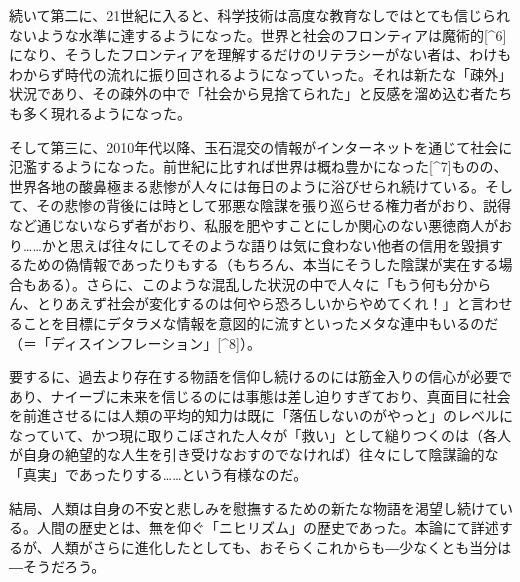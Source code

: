 続いて第二に、21世紀に入ると、科学技術は高度な教育なしではとても信じられないような水準に達するようになった。世界と社会のフロンティアは魔術的{[}\^{}6{]}になり、そうしたフロンティアを理解するだけのリテラシーがない者は、わけもわからず時代の流れに振り回されるようになっていった。それは新たな「疎外」状況であり、その疎外の中で「社会から見捨てられた」と反感を溜め込む者たちも多く現れるようになった。

そして第三に、2010年代以降、玉石混交の情報がインターネットを通じて社会に氾濫するようになった。前世紀に比すれば世界は概ね豊かになった{[}\^{}7{]}ものの、世界各地の酸鼻極まる悲惨が人々には毎日のように浴びせられ続けている。そして、その悲惨の背後には時として邪悪な陰謀を張り巡らせる権力者がおり、説得など通じないならず者がおり、私服を肥やすことにしか関心のない悪徳商人がおり\ldots\ldots かと思えば往々にしてそのような語りは気に食わない他者の信用を毀損するための偽情報であったりもする（もちろん、本当にそうした陰謀が実在する場合もある）。さらに、このような混乱した状況の中で人々に「もう何も分からん、とりあえず社会が変化するのは何やら恐ろしいからやめてくれ！」と言わせることを目標にデタラメな情報を意図的に流すといったメタな連中もいるのだ（＝「ディスインフレーション」{[}\^{}8{]}）。

要するに、過去より存在する物語を信仰し続けるのには筋金入りの信心が必要であり、ナイーブに未来を信じるのには事態は差し迫りすぎており、真面目に社会を前進させるには人類の平均的知力は既に「落伍しないのがやっと」のレベルになっていて、かつ現に取りこぼされた人々が「救い」として縋りつくのは（各人が自身の絶望的な人生を引き受けなおすのでなければ）往々にして陰謀論的な「真実」であったりする\ldots\ldots という有様なのだ。

結局、人類は自身の不安と悲しみを慰撫するための新たな物語を渇望し続けている。人間の歴史とは、無を仰ぐ「ニヒリズム」の歴史であった。本論にて詳述するが、人類がさらに進化したとしても、おそらくこれからも―少なくとも当分は―そうだろう。

